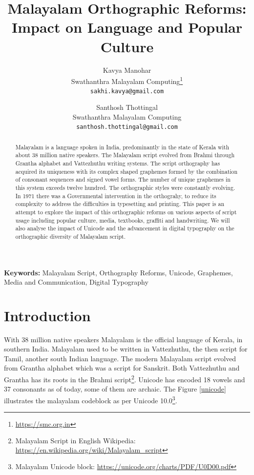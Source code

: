 \documentclass[10pt]{article}
\title{Malayalam Orthographic Reforms: \\Impact on Language and Popular Culture}
\author{Kavya Manohar \\
\small{Swathanthra Malayalam Computing\footnote{\url{https://smc.org.in}}} \\
 {\small {\tt sakhi.kavya@gmail.com}} \\
 \and
 Santhosh Thottingal \\
 \small{Swathanthra Malayalam Computing} \\
 {\small {\tt santhosh.thottingal@gmail.com}}}
\begin{document}
\maketitle

\begin{abstract}

Malayalam is a language spoken in India, predominantly in the state of Kerala with about 38 million native speakers. The Malayalam script evolved from Brahmi through Grantha alphabet and Vattezhuthu writing systems. The script orthography has acquired its uniqueness with its complex shaped graphemes formed by the combination of consonant sequences and signed vowel forms. The number of unique graphemes in this system exceeds twelve hundred. The orthographic styles were constantly evolving. In 1971 there was a Governmental intervention in the orthograhy, to reduce its complexity to address the difficulties in typesetting and printing. This paper is an attempt to explore the impact of this orthographic reforms on various aspects of script usage including popular culture, media, textbooks, graffiti and handwriting. We will also analyse the impact of Unicode and the advancement in digital typography on the orthographic diversity of Malayalam script.

\end{abstract}
 \textbf{Keywords:} Malayalam Script, Orthography Reforms, Unicode, Graphemes, Media and Communication, Digital Typography

\section{Introduction}

\paragraph{}
With 38 million native speakers Malayalam is the official language of Kerala, in southern India. Malayalam used to be written in Vattezhuthu, the then script for Tamil, another south Indian language. The modern Malayalam script evolved from Grantha alphabet which was a script for Sanskrit. Both Vattezhuthu and Grantha has its roots in the Brahmi script\footnote{Malayalam Script in English Wikipedia: \url{https://en.wikipedia.org/wiki/Malayalam_script}}. Unicode has encoded 18 vowels and 37 consonants as of today, some of them are archaic.  The Figure \ref{unicode} illustrates the malayalam codeblock as per Unicode 10.0\footnote{Malayalam Unicode block: \url{https://unicode.org/charts/PDF/U0D00.pdf}}. 
\end{document}
